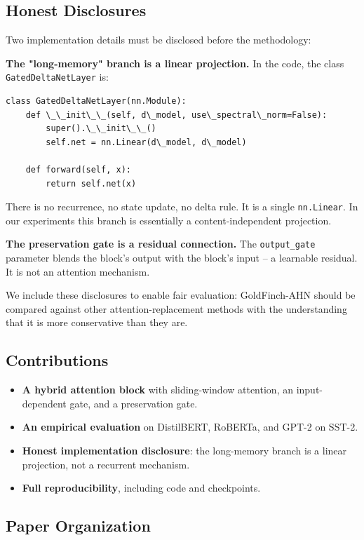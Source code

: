 \subsection{Honest Disclosures}

Two implementation details must be disclosed before the methodology:

\textbf{The "long-memory" branch is a linear projection.} In the code, the class 
\texttt{GatedDeltaNetLayer} is:

\begin{lstlisting}
class GatedDeltaNetLayer(nn.Module):
    def \_\_init\_\_(self, d\_model, use\_spectral\_norm=False):
        super().\_\_init\_\_()
        self.net = nn.Linear(d\_model, d\_model)

    def forward(self, x):
        return self.net(x)
\end{lstlisting}

There is no recurrence, no state update, no delta rule. It is a single 
\texttt{nn.Linear}. In our experiments this branch is essentially a 
content-independent projection.

\textbf{The preservation gate is a residual connection.} The \texttt{output\_gate} 
parameter blends the block's output with the block's input -- a learnable 
residual. It is not an attention mechanism.

We include these disclosures to enable fair evaluation: GoldFinch-AHN 
should be compared against other attention-replacement methods with the 
understanding that it is more conservative than they are.

\subsection{Contributions}

\begin{itemize}
\item \textbf{A hybrid attention block} with sliding-window attention, an input-dependent
  gate, and a preservation gate.
\item \textbf{An empirical evaluation} on DistilBERT, RoBERTa, and GPT-2 on SST-2.
\item \textbf{Honest implementation disclosure}: the long-memory branch is a linear
  projection, not a recurrent mechanism.
\item \textbf{Full reproducibility}, including code and checkpoints.

\end{itemize}
\subsection{Paper Organization}

